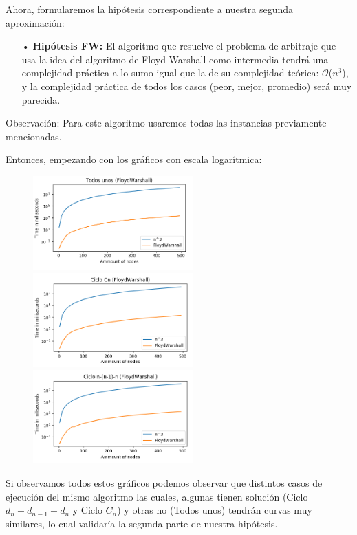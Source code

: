 \documentclass[11pt,a4paper]{article}
\begin{document}
Ahora, formularemos la hip\'otesis correspondiente a nuestra segunda aproximaci\'on:

\begin{itemize}
    \item[•] \textbf{Hip\'otesis FW:} El algoritmo que resuelve el problema de arbitraje que usa la idea del algoritmo de Floyd-Warshall como intermedia tendr\'a una complejidad pr\'actica a lo sumo igual que la de su complejidad te\'orica: $\mathcal{O}$($n^{3}$), y la complejidad pr\'actica de todos los casos (peor, mejor, promedio) ser\'a muy parecida.
\end{itemize}

Observaci\'on: Para este algoritmo usaremos todas las instancias previamente mencionadas.

Entonces, empezando con los gr\'aficos con escala logar\'itmica:


\begin{figure}[h]
    \includegraphics[width=0.55\textwidth]{FWlog-unos.png}
    \includegraphics[width=0.55\textwidth]{FWlog-cn.png}
    \includegraphics[width=0.55\textwidth]{FWlog-nnl1n.png}
\end{figure}

Si observamos todos estos gr\'aficos podemos observar que distintos casos de ejecuci\'on del mismo algoritmo las cuales, algunas tienen soluci\'on (Ciclo $d_{n}-d_{n-1}-d_{n}$ y Ciclo $C_{n}$) y otras no (Todos unos) tendr\'an curvas muy similares, lo cual validar\'ia la segunda parte de nuestra hip\'otesis. 
\end{document}
